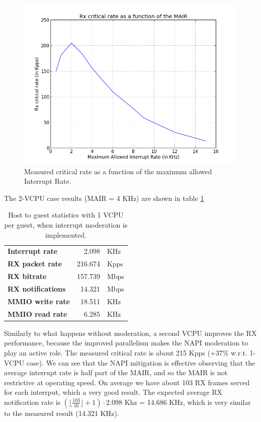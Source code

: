 \begin{figure}[bt]
\centering
\includegraphics[scale = 0.7]{MAIR-vs-CR.png}
\caption{Measured critical rate as a function of the maximum allowed Interrupt Rate.}
\label{fig:itr-vs-cr}
\end{figure}


\vspace{0.5cm}

The 2-VCPU case results (MAIR = 4 KHz) are shown in table \ref{tab:e1000-mit-rx-g2h2vcpu}

\begin{table}
\begin{center}
\begin{tabular}{lrl}
\toprule
\textbf{Interrupt rate} & 2.098 & KHz\\
\textbf{RX packet rate} & 216.674 & Kpps\\
\textbf{RX bitrate} & 157.739 & Mbps\\
\textbf{RX notifications} & 14.321 & Mbps\\
\textbf{MMIO write rate} & 18.511 & KHz\\
\textbf{MMIO read rate} & 6.285 & KHz\\
\bottomrule
\end{tabular}
\end{center}
\caption{Host to guest statistics with 1 VCPU per guest, when interrupt moderation is implemented.}
\label{tab:e1000-mit-rx-g2h2vcpu}
\end{table}

Similarly to what happens without moderation, a second VCPU improves the RX performance, because the improved parallelism makes the
NAPI moderation to play an active role.
The measured critical rate is about 215 Kpps (+37\% w.r.t. 1-VCPU case).
We can see that the NAPI mitigation is effective observing that the average interrupt rate is half part of the MAIR, and so the MAIR is not
restrictive at operating speed. On average we have about 103 RX frames served for each interrput, which a very good result.
The expected average RX notification rate is $(\lfloor \frac{103}{16} \rfloor + 1) \cdot 2.098$ Khz = 14.686 KHz, which is very similar to
the measured result (14.321 KHz).




